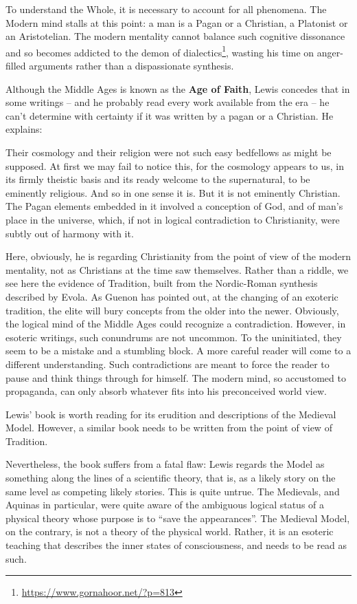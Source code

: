 To understand the Whole, it is necessary to account for all phenomena. The Modern mind stalls at this point: a man is a Pagan or a Christian, a Platonist or an Aristotelian. The modern mentality cannot balance such cognitive dissonance and so becomes addicted to the demon of dialectics\footnote{\url{https://www.gornahoor.net/?p=813}}, wasting his time on anger-filled arguments rather than a dispassionate synthesis.

Although the Middle Ages is known as the \textbf{Age of Faith}, Lewis concedes that in some writings -- and he probably read every work available from the era -- he can't determine with certainty if it was written by a pagan or a Christian. He explains:

\begin{quotex}
Their cosmology and their religion were not such easy bedfellows as might be supposed. At first we may fail to notice this, for the cosmology appears to us, in its firmly theistic basis and its ready welcome to the supernatural, to be eminently religious. And so in one sense it is. But it is not eminently Christian. The Pagan elements embedded in it involved a conception of God, and of man's place in the universe, which, if not in logical contradiction to Christianity, were subtly out of harmony with it.
\end{quotex}


Here, obviously, he is regarding Christianity from the point of view of the modern mentality, not as Christians at the time saw themselves. Rather than a riddle, we see here the evidence of Tradition, built from the Nordic-Roman synthesis described by Evola. As Guenon has pointed out, at the changing of an exoteric tradition, the elite will bury concepts from the older into the newer. Obviously, the logical mind of the Middle Ages could recognize a contradiction. However, in esoteric writings, such conundrums are not uncommon. To the uninitiated, they seem to be a mistake and a stumbling block. A more careful reader will come to a different understanding. Such contradictions are meant to force the reader to pause and think things through for himself. The modern mind, so accustomed to propaganda, can only absorb whatever fits into his preconceived world view.

Lewis' book is worth reading for its erudition and descriptions of the Medieval Model. However, a similar book needs to be written from the point of view of Tradition.

Nevertheless, the book suffers from a fatal flaw: Lewis regards the Model as something along the lines of a scientific theory, that is, as a likely story on the same level as competing likely stories. This is quite untrue. The Medievals, and Aquinas in particular, were quite aware of the ambiguous logical status of a physical theory whose purpose is to ``save the appearances''. The Medieval Model, on the contrary, is not a theory of the physical world. Rather, it is an esoteric teaching that describes the inner states of consciousness, and needs to be read as such.

